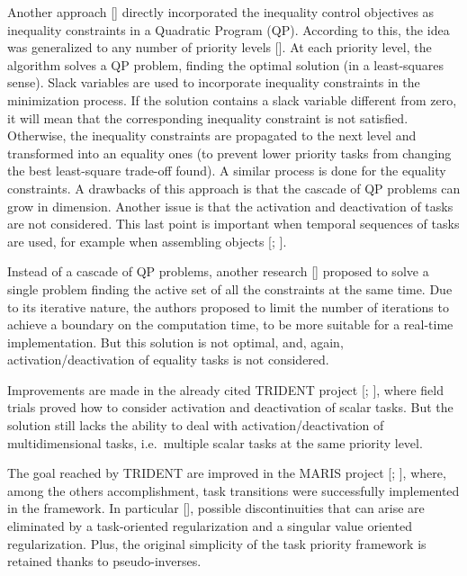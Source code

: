 Another approach [\cite{IntroTpik25}] directly incorporated the inequality control objectives as inequality constraints in a Quadratic Program (QP). According to this, the idea was generalized to any number of priority levels [\cite{IntroTpik26}]. At each priority level, the algorithm solves a QP problem, finding the optimal solution (in a least-squares sense). Slack variables are used to incorporate inequality constraints in the minimization process. If the solution contains a slack variable different from zero, it will mean that the corresponding inequality constraint is not satisfied. Otherwise, the inequality constraints are propagated to the next level and transformed into an equality ones (to prevent lower priority tasks from changing the best least-square trade-off found). A similar process is done for the equality constraints. A drawbacks of this approach is that the cascade of QP problems can grow in dimension. Another issue is that the activation and deactivation of tasks are not considered. This last point is important when temporal sequences of tasks are used, for example when  assembling objects [\cite{IntroTpik28}; \cite{IntroTpik27}].

Instead of a cascade of QP problems, another research [\cite{IntroTpik29}] proposed to solve a single problem finding the active set of all the constraints at the same time. Due to its iterative nature, the authors proposed to limit the number of iterations to achieve a boundary on the computation time, to be more suitable for a real-time implementation. But this solution is not optimal, and, again, activation/deactivation of equality tasks is not considered.

Improvements are made in the already cited TRIDENT project [\cite{IntroTrident1}; \cite{IntroTrident4}], where field trials proved how to consider activation and deactivation of scalar tasks. But the solution still lacks the ability to deal with activation/deactivation of multidimensional tasks, i.e.\ multiple scalar tasks at the same priority level.

The goal reached by TRIDENT are improved in the MARIS project [\cite{IntroMaris0}; \cite{IntroTpik30}], where, among the others accomplishment, task transitions were successfully implemented in the framework. In particular [\cite{IntroMaris1}], possible discontinuities that can arise are eliminated by a task-oriented regularization and a singular value oriented regularization. Plus, the original simplicity of the task priority framework is retained thanks to pseudo-inverses.


